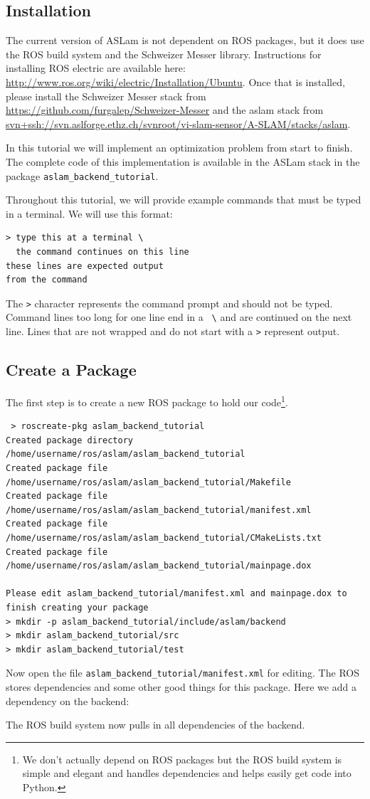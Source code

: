 \documentclass[11pt,a4,oneside]{article}
\newcommand{\txt}[1]{{\footnotesize\texttt{#1}}}
\newcommand{\rospack}[1]{\href{http://www.ros.org/wiki/#1}{{\rosfont{#1}}}}
\newcommand{\surl}[1]{{\footnotesize\url{#1}}}
\newcommand{\listxmlrange}[4]{}
\begin{document}
\subsection{Installation}
The current version of ASLam is not dependent on ROS packages, but it does use the ROS build system and the Schweizer Messer library. Instructions for installing ROS electric are available here: \surl{http://www.ros.org/wiki/electric/Installation/Ubuntu}. Once that is installed, please install the Schweizer Messer stack from \surl{https://github.com/furgalep/Schweizer-Messer} and the aslam stack from \surl{svn+ssh://svn.aslforge.ethz.ch/svnroot/vi-slam-sensor/A-SLAM/stacks/aslam}.

In this tutorial we will implement an optimization problem from start to finish. The complete code of this implementation is available in the ASLam stack in the package \txt{aslam\_backend\_tutorial}.

Throughout this tutorial, we will provide example commands that must be typed in a terminal. We will use this format:
\begin{lstlisting}
> type this at a terminal \
  the command continues on this line
these lines are expected output
from the command
\end{lstlisting}
The \txt{\textgreater} character represents the command prompt and should not be typed. Command lines too long for one line end in a \txt{ \textbackslash } and are continued on the next line. Lines that are not wrapped and do not start with a \txt{\textgreater} represent output.

\subsection{Create a Package}
The first step is to create a new ROS package to hold our code\footnote{We don't actually depend on ROS packages but the ROS build system is simple and elegant and handles dependencies and helps easily get code into Python.}. 
\begin{lstlisting}
 > roscreate-pkg aslam_backend_tutorial
Created package directory /home/username/ros/aslam/aslam_backend_tutorial
Created package file /home/username/ros/aslam/aslam_backend_tutorial/Makefile
Created package file /home/username/ros/aslam/aslam_backend_tutorial/manifest.xml
Created package file /home/username/ros/aslam/aslam_backend_tutorial/CMakeLists.txt
Created package file /home/username/ros/aslam/aslam_backend_tutorial/mainpage.dox

Please edit aslam_backend_tutorial/manifest.xml and mainpage.dox to finish creating your package
> mkdir -p aslam_backend_tutorial/include/aslam/backend
> mkdir aslam_backend_tutorial/src
> mkdir aslam_backend_tutorial/test
\end{lstlisting}
Now open the file \txt{aslam\_backend\_tutorial/manifest.xml} for editing. The ROS \rospack{Manifest} stores dependencies and some other good things for this package. Here we add a dependency on the backend:
\listxmlrange{package.xml}{../../aslam_backend_tutorial/package.xml}{12}{13}
The ROS build system now pulls in all dependencies of the backend.
\end{document}
